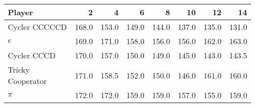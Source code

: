 \begin{tabular}{lrrrrrrr}
\toprule
            Player &      2 &      4 &      6 &      8 &     10 &     12 &     14 \\
\midrule
     Cycler CCCCCD &  168.0 &  153.0 &  149.0 &  144.0 &  137.0 &  135.0 &  131.0 \\
               $e$ &  169.0 &  171.0 &  158.0 &  156.0 &  156.0 &  162.0 &  163.0 \\
       Cycler CCCD &  170.0 &  157.0 &  150.0 &  149.0 &  145.0 &  143.0 &  143.5 \\
 Tricky Cooperator &  171.0 &  158.5 &  152.0 &  150.0 &  146.0 &  161.0 &  160.0 \\
             $\pi$ &  172.0 &  172.0 &  159.0 &  159.0 &  157.0 &  155.0 &  159.0 \\
\bottomrule
\end{tabular}
